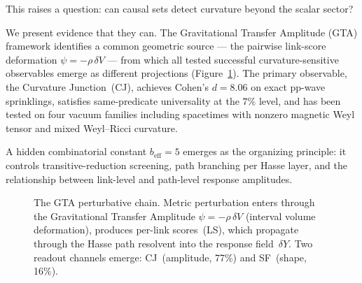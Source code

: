 \documentclass[12pt,a4paper]{article}
\begin{document}
This raises a question: can causal sets detect curvature beyond the scalar sector?

We present evidence that they can. The Gravitational Transfer Amplitude (GTA) framework identifies a common geometric source --- the pairwise link-score deformation $\psi = -\rho\,\delta V$ --- from which all tested successful curvature-sensitive observables emerge as different projections (Figure~\ref{fig:chain}). The primary observable, the Curvature Junction~(CJ), achieves Cohen's $d = 8.06$ on exact pp-wave sprinklings, satisfies same-predicate universality at the $7\%$ level, and has been tested on four vacuum families including spacetimes with nonzero magnetic Weyl tensor and mixed Weyl--Ricci curvature.

A hidden combinatorial constant $b_{\mathrm{eff}} = 5$ emerges as the organizing principle: it controls transitive-reduction screening, path branching per Hasse layer, and the relationship between link-level and path-level response amplitudes.

\begin{figure}[h!]
\centering
{}
\caption{The GTA perturbative chain. Metric perturbation enters through the Gravitational Transfer Amplitude $\psi = -\rho\,\delta V$ (interval volume deformation), produces per-link scores~(LS), which propagate through the Hasse path resolvent into the response field~$\delta Y$. Two readout channels emerge: CJ~(amplitude, 77\%) and SF~(shape, 16\%).}
\label{fig:chain}
\end{figure}
\end{document}
